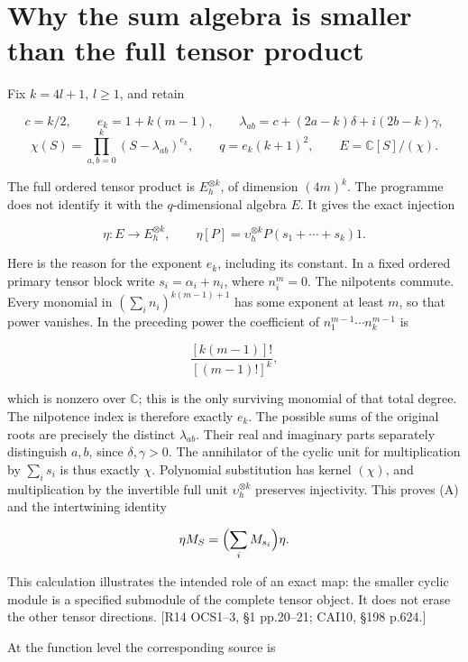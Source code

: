 \section{Why the sum algebra is smaller than the full tensor product}\label{why-the-sum-algebra-is-smaller-than-the-full-tensor-product}

Fix \(k=4l+1\), \(l\ge1\), and retain

\[
c=k/2,\qquad e_k=1+k(m-1),\qquad
\lambda_{ab}=c+(2a-k)\delta+i(2b-k)\gamma,
\] \[
\chi(S)=\prod_{a,b=0}^{k}(S-\lambda_{ab})^{e_k},\qquad
q=e_k(k+1)^2,\qquad E=\mathbb C[S]/(\chi).
\]

The full ordered tensor product is \(E_h^{\otimes k}\), of dimension \((4m)^k\). The programme does not identify it with the \(q\)-dimensional algebra \(E\). It gives the exact injection

\[
\eta:E\longrightarrow E_h^{\otimes k},\qquad
\eta[P]=\upsilon_h^{\otimes k}P(s_1+\cdots+s_k)1.
\tag{A}
\]

Here is the reason for the exponent \(e_k\), including its constant. In a fixed ordered primary tensor block write \(s_i=\alpha_i+n_i\), where \(n_i^m=0\). The nilpotents commute. Every monomial in \((\sum_i n_i)^{k(m-1)+1}\) has some exponent at least \(m\), so that power vanishes. In the preceding power the coefficient of \(n_1^{m-1}\cdots n_k^{m-1}\) is

\[
\frac{[k(m-1)]!}{[(m-1)!]^k},
\]

which is nonzero over \(\mathbb C\); this is the only surviving monomial of that total degree. The nilpotence index is therefore exactly \(e_k\). The possible sums of the original roots are precisely the distinct \(\lambda_{ab}\). Their real and imaginary parts separately distinguish \(a,b\), since \(\delta,\gamma>0\). The annihilator of the cyclic unit for multiplication by \(\sum_i s_i\) is thus exactly \(\chi\). Polynomial substitution has kernel \((\chi)\), and multiplication by the invertible full unit \(\upsilon_h^{\otimes k}\) preserves injectivity. This proves (A) and the intertwining identity

\[
\eta M_S=\Bigl(\sum_iM_{s_i}\Bigr)\eta.
\]

This calculation illustrates the intended role of an exact map: the smaller cyclic module is a specified submodule of the complete tensor object. It does not erase the other tensor directions. {[}R14 OCS1--3, §1 pp.20--21; CAI10, §198 p.624.{]}

At the function level the corresponding source is

